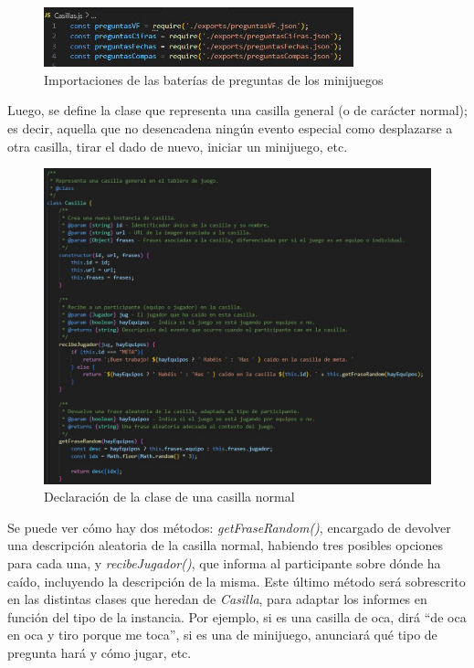 \begin{figure}[H]
	\centering
	\includegraphics[width=0.8\textwidth]{imgs/codigo-casillas-1.jpg}
	\caption{Importaciones de las baterías de preguntas de los minijuegos}
	\label{fig:codigo-casillas-1}
\end{figure}

\newpage
Luego, se define la clase que representa una casilla general (o de carácter normal); es decir, aquella que no desencadena ningún evento especial como desplazarse a otra casilla, tirar el dado de nuevo, iniciar un minijuego, etc.

\begin{figure}[H]
	\centering
	\includegraphics[width=1\textwidth]{imgs/codigo-casillas-2.jpg}
	\caption{Declaración de la clase de una casilla normal}
	\label{fig:codigo-casillas-2}
\end{figure}

Se puede ver cómo hay dos métodos: \textit{getFraseRandom()}, encargado de devolver una descripción aleatoria de la casilla normal, habiendo tres posibles opciones para cada una, y \textit{recibeJugador()}, que informa al participante sobre dónde ha caído, incluyendo la descripción de la misma. 
Este último método será sobrescrito en las distintas clases que heredan de \textit{Casilla}, para adaptar los informes en función del tipo de la instancia. Por ejemplo, si es una casilla de oca, dirá \enquote{de oca en oca y tiro porque me toca}, si es una de minijuego, anunciará qué tipo de pregunta hará y cómo jugar, etc.

